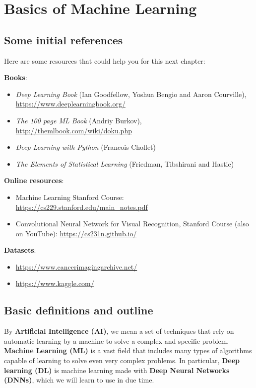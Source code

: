 \section{Basics of Machine Learning}

\subsection{Some initial references}
Here are some resources that could help you for this next chapter:

\textbf{Books}:
\begin{itemize}
    \item[-] \emph{Deep Learning Book} (Ian Goodfellow, Yoshua Bengio and Aaron Courville), \url{https://www.deeplearningbook.org/}
    \item[-] \emph{The 100 page ML Book} (Andriy Burkov), \url{http://themlbook.com/wiki/doku.php}
    \item[-] \emph{Deep Learning with Python} (Francois Chollet)
    \item[-] \emph{The Elements of Statistical Learning} (Friedman, Tibshirani and Hastie)
\end{itemize}

\textbf{Online resources}:
\begin{itemize}
    \item[-] Machine Learning Stanford Course: \url{https://cs229.stanford.edu/main_notes.pdf}
    \item[-] Convolutional Neural Network for Visual Recognition, Stanford Course (also on YouTube): \url{https://cs231n.github.io/}
\end{itemize}

\textbf{Datasets}:
\begin{itemize}
    \item[-] \url{https://www.cancerimagingarchive.net/}
    \item[-] \url{https://www.kaggle.com/}
\end{itemize}


\subsection{Basic definitions and outline}

By \textbf{Artificial Intelligence (AI)}, we mean a set of techniques that rely on automatic learning by a machine to solve a complex and specific problem. 
\textbf{Machine Learning (ML)} is a vast field that includes many types of algorithms capable of learning to solve even very complex problems. 
In particular, \textbf{Deep learning (DL)} is machine learning made with \textbf{Deep Neural Networks (DNNs)}, which we will learn to use in due time.

